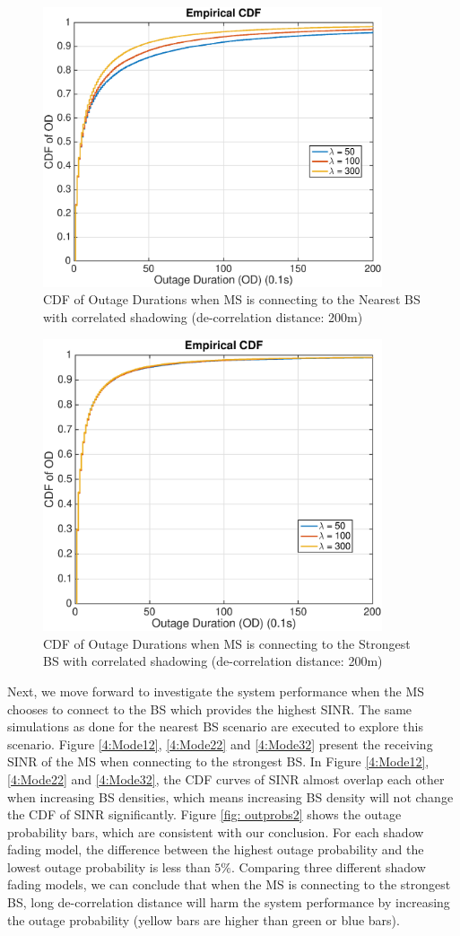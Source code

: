  \begin{figure}
 \centering
 \includegraphics[width=10cm]{ODthresh-5DeCorr200NBMode2.eps}
 \caption{CDF of Outage Durations when MS is connecting to the Nearest BS with correlated shadowing (de-correlation distance: 200m)}
 \label{corr1}
 \end{figure}
 \begin{figure}
 \centering
 \includegraphics[width=10cm]{ODthresh-5DeCorr200MaxMode2.eps}
 \caption{CDF of Outage Durations when MS is connecting to the Strongest BS with correlated shadowing (de-correlation distance: 200m)}
 \label{corr2}
 \end{figure}
 \par Next, we move forward to investigate the system performance when the MS chooses to connect to the BS which provides the highest SINR. The same simulations as done for the nearest BS scenario are executed to explore this scenario. Figure \ref{4:Mode12}, \ref{4:Mode22} and \ref{4:Mode32} present the receiving SINR of the MS when connecting to the strongest BS. In Figure \ref{4:Mode12}, \ref{4:Mode22} and \ref{4:Mode32}, the CDF curves of SINR almost overlap each other when increasing BS densities, which means increasing BS density will not change the CDF of SINR significantly. Figure \ref{fig: outprobs2} shows the outage probability bars, which are consistent with our conclusion. For each shadow fading model, the difference between the highest outage probability and the lowest outage probability is less than $5\%$. Comparing three different shadow fading models, we can conclude that when the MS is connecting to the strongest BS, long de-correlation distance will harm the system performance by increasing the outage probability (yellow bars are higher than green or blue bars). 
